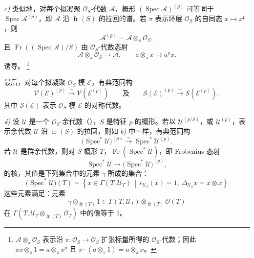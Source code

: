 \smallskip
\noindent\textit{c)}
类似地，对每个拟凝聚 \(\mathcal O_S\)-代数 \(\mathcal A\)，概形 \((\operatorname{Spec}\mathcal A)^{(p)}\) 可等同于 \(\operatorname{Spec}\mathcal A^{(p)}\)，即 \(\mathcal A\) 沿 \(\operatorname{fr}(S)\) 的拉回的谱。若 \(\pi\) 表示环层 \(\mathcal O_S\) 的自同态 \(x\mapsto x^p\)，则
\[
  \mathcal A^{(p)}
  =
  \mathcal A\otimes_\pi\mathcal O_S,
  \tag{44}\label{sga3:vii:paragraph:4-1-4:equation:44}
\]
且 \(\operatorname{Fr}((\operatorname{Spec}\mathcal A)/S)\) 由 \(\mathcal O_S\)-代数态射
\[
  \mathcal A\otimes_\pi\mathcal O_S
  \longrightarrow
  \mathcal A,
  \qquad
  a\otimes_\pi x\longmapsto a^p x.
\]
诱导。
\footnote{\(\mathcal A\otimes_\pi\mathcal O_S\) 表示沿 \(\pi:\mathcal O_S\to\mathcal O_S\) 扩张标量所得的 \(\mathcal O_S\)-代数；因此 \(ax\otimes_\pi1=a\otimes_\pi x^p\) 且 \(x\cdot(a\otimes_\pi1)=a\otimes_\pi x\)。}

最后，对每个拟凝聚 \(\mathcal O_S\)-模 \(\mathcal E\)，有典范同构
\[
  \mathcal V(\mathcal E)^{(p)}
  \xrightarrow{\sim}
  \mathcal V(\mathcal E^{(p)})
  \qquad\text{及}\qquad
  \mathcal S(\mathcal E)^{(p)}
  \xrightarrow{\sim}
  \mathcal S(\mathcal E^{(p)}),
\]
其中 \(\mathcal S(\mathcal E)\) 表示 \(\mathcal O_S\)-模 \(\mathcal E\) 的对称代数。

\smallskip
\noindent\textit{d)}
设 \(\mathcal U\) 是一个 \(\mathcal O_S\)-余代数（），\(S\) 是特征 \(p\) 的概形。若以 \(\mathcal U^{(p/S)}\)，或 \(\mathcal U^{(p)}\)，表示余代数 \(\mathcal U\) 沿 \(\operatorname{fr}(S)\) 的拉回，则如 \textit{b)} 中一样，有典范同构
\[
  \bigl(\operatorname{Spec}^{*}\mathcal U\bigr)^{(p)}
  \xrightarrow{\sim}
  \operatorname{Spec}^{*}\mathcal U^{(p)}.
\]
若 \(\mathcal U\) 是群余代数，则对 \(S\)-概形 \(T\)，\(\operatorname{Fr}(\operatorname{Spec}^{*}\mathcal U)\)，即 Frobenius 态射
\[
  \operatorname{Spec}^{*}\mathcal U
  \longrightarrow
  \bigl(\operatorname{Spec}^{*}\mathcal U\bigr)^{(p)},
\]
的核，其值是下列集合中的元素 \(\gamma\) 所成的集合：
\[
  \bigl(\operatorname{Spec}^{*}\mathcal U\bigr)(T)
  =
  \left\{
    x\in\Gamma(T,\mathcal U_T)
    \,\middle|\,
    \varepsilon_{\mathcal U_T}(x)=1,\ 
    \Delta_{\mathcal U_T}x=x\otimes x
  \right\}
\]
这些元素满足：元素
\[
  \gamma\otimes_{\operatorname{fr}(T)}1
  \in
  \Gamma(T,\mathcal U_T)\otimes_{\operatorname{fr}(T)}
    \mathcal O(T)
\]
在 \(\Gamma(T,\mathcal U_T\otimes_{\operatorname{fr}(T)}\mathcal O_T)\) 中的像等于 \(1\)。

